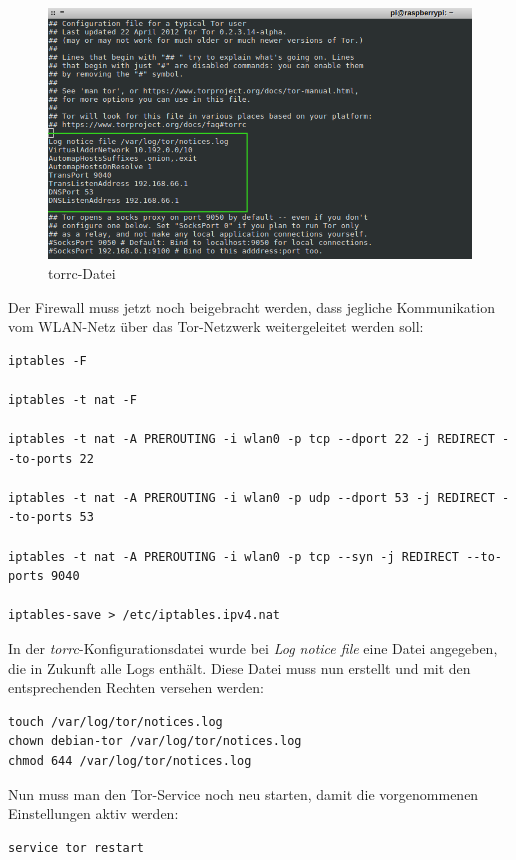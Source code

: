 \begin{figure}[h]
\centering
\includegraphics[scale=0.6]{images/torrc}
\caption{torrc-Datei}
\end{figure}
 	
Der Firewall muss jetzt noch beigebracht werden, dass jegliche Kommunikation vom WLAN-Netz über das Tor-Netzwerk weitergeleitet werden soll:

\begin{lstlisting}
iptables -F

iptables -t nat -F

iptables -t nat -A PREROUTING -i wlan0 -p tcp --dport 22 -j REDIRECT --to-ports 22

iptables -t nat -A PREROUTING -i wlan0 -p udp --dport 53 -j REDIRECT --to-ports 53

iptables -t nat -A PREROUTING -i wlan0 -p tcp --syn -j REDIRECT --to-ports 9040

iptables-save > /etc/iptables.ipv4.nat
\end{lstlisting}

In der \textit{torrc}-Konfigurationsdatei wurde bei \textit{Log notice file} eine Datei angegeben, die in Zukunft alle Logs enthält. Diese Datei muss nun erstellt und mit den entsprechenden Rechten versehen werden:

\begin{lstlisting}
touch /var/log/tor/notices.log
chown debian-tor /var/log/tor/notices.log
chmod 644 /var/log/tor/notices.log
\end{lstlisting}

Nun muss man den Tor-Service noch neu starten, damit die vorgenommenen Einstellungen aktiv werden:

\begin{lstlisting}
service tor restart
\end{lstlisting}

